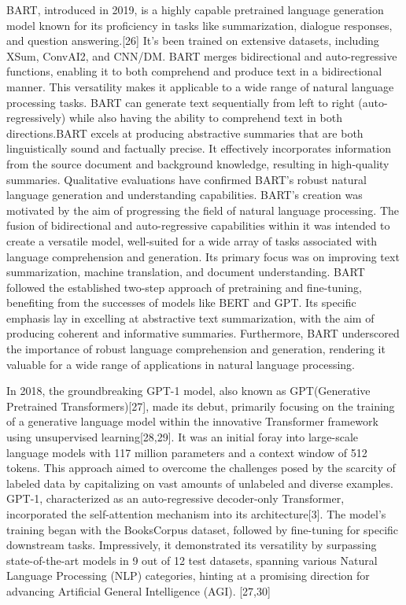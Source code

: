 \documentclass[conference]{IEEEtran}
\begin{document}
BART, introduced in 2019, is a highly capable pretrained language generation model known for its proficiency in tasks like summarization, dialogue responses, and question answering.[26] It's been trained on extensive datasets, including XSum, ConvAI2, and CNN/DM. BART merges bidirectional and auto-regressive functions, enabling it to both comprehend and produce text in a bidirectional manner. This versatility makes it applicable to a wide range of natural language processing tasks. BART can generate text sequentially from left to right (auto-regressively) while also having the ability to comprehend text in both directions.BART excels at producing abstractive summaries that are both linguistically sound and factually precise. It effectively incorporates information from the source document and background knowledge, resulting in high-quality summaries. Qualitative evaluations have confirmed BART's robust natural language generation and understanding capabilities.
BART's creation was motivated by the aim of progressing the field of natural language processing. The fusion of bidirectional and auto-regressive capabilities within it was intended to create a versatile model, well-suited for a wide array of tasks associated with language comprehension and generation. Its primary focus was on improving text summarization, machine translation, and document understanding. BART followed the established two-step approach of pretraining and fine-tuning, benefiting from the successes of models like BERT and GPT. Its specific emphasis lay in excelling at abstractive text summarization, with the aim of producing coherent and informative summaries. Furthermore, BART underscored the importance of robust language comprehension and generation, rendering it valuable for a wide range of applications in natural language processing.


In 2018, the groundbreaking GPT-1 model, also known as GPT(Generative Pretrained Transformers)[27], made its debut, primarily focusing on the training of a generative language model within the innovative Transformer framework using unsupervised learning[28,29]. It was an initial foray into large-scale language models with 117 million parameters and a context window of 512 tokens. This approach aimed to overcome the challenges posed by the scarcity of labeled data by capitalizing on vast amounts of unlabeled and diverse examples. GPT-1, characterized as an auto-regressive decoder-only Transformer, incorporated the self-attention mechanism into its architecture[3]. The model's training began with the BooksCorpus dataset, followed by fine-tuning for specific downstream tasks. Impressively, it demonstrated its versatility by surpassing state-of-the-art models in 9 out of 12 test datasets, spanning various Natural Language Processing (NLP) categories, hinting at a promising direction for advancing Artificial General Intelligence (AGI). [27,30]
\end{document}
